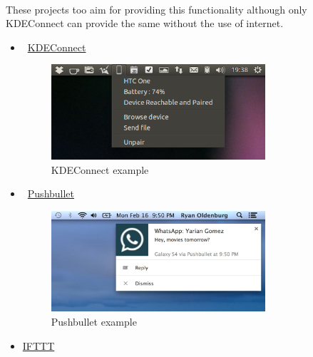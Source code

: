 \documentclass[12pt, letterpaper, titlepage]{article}
\begin{document}
    \paragraph{}
    These projects too aim for providing this functionality although only
    KDEConnect can provide the same without the use of internet.
    \begin{itemize}
        \item{\
            \href{https://community.kde.org/KDEConnect}{KDEConnect}
            \begin{figure}[h!]
                \includegraphics[width=0.75\textwidth]{kdeconnect.png}
                \centering
                \caption{KDEConnect example}
            \end{figure}
        }
        \item{\
            \href{https://www.pushbullet.com/}{Pushbullet}
            \begin{figure}[h!]
                \includegraphics[width=0.75\textwidth]{pushbullet.jpg}
                \centering
                \caption{Pushbullet example}
            \end{figure}
        }
        \item{\href{https://ifttt.com/}{IFTTT}}
    \end{itemize}
\end{document}
